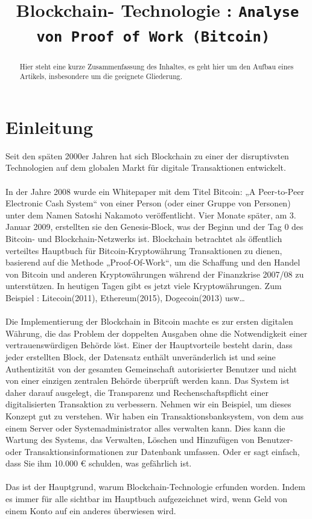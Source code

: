 \documentclass[ngerman]{scrreprt}
\title{Blockchain- Technologie : \texttt{Analyse von Proof of Work (Bitcoin) }}
\begin{document}
  \maketitle  
  \begin{abstract}
    Hier steht eine kurze Zusammenfassung des Inhaltes, es geht hier um den Aufbau eines Artikels, insbesondere um die geeignete Gliederung.
  \end{abstract}

  \tableofcontents


\chapter{Einleitung}
Seit den späten 2000er Jahren hat sich Blockchain zu einer der disruptivsten Technologien auf dem globalen Markt für digitale Transaktionen entwickelt.\\ \\
In der Jahre 2008 wurde ein Whitepaper mit dem Titel Bitcoin: „A Peer-to-Peer Electronic Cash System“ von einer Person (oder einer Gruppe von Personen) unter dem Namen Satoshi Nakamoto veröffentlicht. Vier Monate später, am 3. Januar 2009, erstellten sie den Genesis-Block, was der Beginn und der Tag 0 des Bitcoin- und Blockchain-Netzwerks ist. Blockchain betrachtet als öffentlich verteiltes Hauptbuch für Bitcoin-Kryptowährung Transaktionen zu dienen, basierend auf die Methode „Proof-Of-Work“, um die Schaffung und den Handel von Bitcoin und anderen Kryptowährungen während der Finanzkrise 2007/08 zu unterstützen. In heutigen Tagen gibt es jetzt viele Kryptowährungen. Zum Beispiel : Litecoin(2011), Ethereum(2015), Dogecoin(2013) usw… \\ \\
Die Implementierung der Blockchain in Bitcoin machte es zur ersten digitalen Währung, die das Problem der doppelten Ausgaben ohne die Notwendigkeit einer vertrauenswürdigen Behörde löst. Einer der Hauptvorteile besteht darin, dass jeder erstellten Block, der Datensatz enthält unveränderlich ist und seine Authentizität von der gesamten Gemeinschaft autorisierter Benutzer und nicht von einer einzigen zentralen Behörde überprüft werden kann. Das System ist daher darauf ausgelegt, die Transparenz und Rechenschaftspflicht einer digitalisierten Transaktion zu verbessern. Nehmen wir ein Beispiel, um dieses Konzept gut zu verstehen. Wir haben ein Transaktionsbanksystem, von dem aus einem Server oder Systemadministrator alles verwalten kann. Dies kann die Wartung des Systems, das Verwalten, Löschen und Hinzufügen von Benutzer- oder Transaktionsinformationen zur Datenbank umfassen. Oder er sagt einfach, dass Sie ihm 10.000 € schulden, was gefährlich ist. \\ \\
Das ist der Hauptgrund, warum Blockchain-Technologie erfunden worden. Indem es immer für alle sichtbar im Hauptbuch aufgezeichnet wird, wenn Geld von einem Konto auf ein anderes überwiesen wird.
\end{document}
